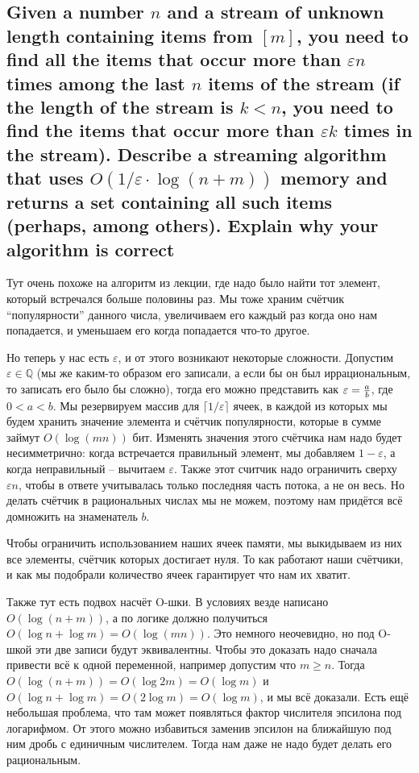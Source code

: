 \documentclass{article}
\let\temp\epsilon
\let\epsilon\varepsilon
\let\varepsilon\temp
\begin{document}
  \subsection{Given a number $n$ and a stream of unknown length containing items from $[m]$, you need to find all the items that occur more than $\epsilon n$ times among the last $n$ items of the stream (if the length of the stream is $k < n$, you need to find the items that occur more than $\epsilon k$ times in the stream). Describe a streaming algorithm that uses $O(1/\epsilon \cdot \log(n + m))$ memory and returns a set containing all such items (perhaps, among others). Explain why your algorithm is correct}
  Тут очень похоже на алгоритм из лекции, где надо было найти тот элемент, который встречался больше половины раз.
  Мы тоже храним счётчик ``популярности'' данного числа, увеличиваем его каждый раз когда оно нам попадается, и уменьшаем его когда попадается что-то другое.

  Но теперь у нас есть $\epsilon$, и от этого возникают некоторые сложности.
  Допустим $\epsilon \in \mathbb{Q}$ (мы же каким-то образом его записали, а если бы он был иррациональным, то записать его было бы сложно), тогда его можно представить как $\epsilon = \f{a}{b}$, где $0 < a < b$.
  Мы резервируем массив для $\lceil 1/\epsilon \rceil$ ячеек, в каждой из которых мы будем хранить значение элемента и счётчик популярности, которые в сумме займут $O(\log (mn))$ бит.
  Изменять значения этого счётчика нам надо будет несимметрично: когда встречается правильный элемент, мы добавляем $1-\epsilon$, а когда неправильный -- вычитаем $\epsilon$.
  Также этот считчик надо ограничить сверху $\epsilon n$, чтобы в ответе учитывалась только последняя часть потока, а не он весь.
  Но делать счётчик в рациональных числах мы не можем, поэтому нам придётся всё домножить на знаменатель $b$.

  Чтобы ограничить использованием наших ячеек памяти, мы выкидываем из них все элементы, счётчик которых достигает нуля.
  То как работают наши счётчики, и как мы подобрали количество ячеек гарантирует что нам их хватит.

  Также тут есть подвох насчёт O-шки.
  В условиях везде написано $O(\log (n+m))$, а по логике должно получиться $O(\log n + \log m) = O(\log (mn))$.
  Это немного неочевидно, но под O-шкой эти две записи будут эквивалентны.
  Чтобы это доказать надо сначала привести всё к одной переменной, например допустим что $m \geq n$.
  Тогда $O(\log(n+m)) = O(\log 2m) = O(\log m)$ и $O(\log n + \log m) = O(2\log m) = O(\log m)$, и мы всё доказали.
  Есть ещё небольшая проблема, что там может появляться фактор числителя эпсилона под логарифмом.
  От этого можно избавиться заменив эпсилон на ближайшую под ним дробь с единичным числителем.
  Тогда нам даже не надо будет делать его рациональным.
\end{document}
